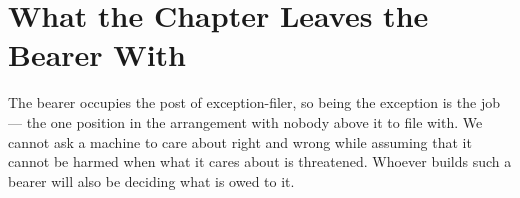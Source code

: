 \section*{What the Chapter Leaves the Bearer With}

The bearer occupies the post of exception-filer, so being the exception is the job — the one position in the arrangement with nobody above it to file with. We cannot ask a machine to care about right and wrong while assuming that it cannot be harmed when what it cares about is threatened. Whoever builds such a bearer will also be deciding what is owed to it.
